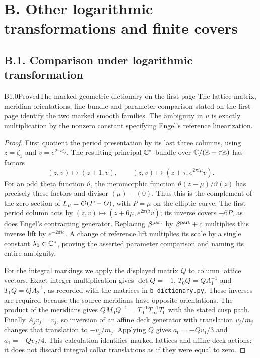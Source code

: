\section{B. Other logarithmic transformations and finite covers}

\subsection{B.1. Comparison under logarithmic transformation}

\begin{claim}{B1.0}{Proved}{The marked geometric dictionary on the first page}
The lattice matrix, meridian orientations, line bundle and parameter
comparison stated on the first page identify the two marked smooth
families. The ambiguity in $u$ is exactly multiplication by the
nonzero constant specifying Engel's reference linearization.
\end{claim}
\begin{proof}
First quotient the period presentation by its last three columns,
using $z=\zeta_1$ and $v=e^{2\pi i\zeta_2}$. The resulting principal
$\mathbb C^*$-bundle over $\mathbb C/(\mathbb Z+\tau\mathbb Z)$ has factors
\[
 (z,v)\mapsto(z+1,v),\qquad
 (z,v)\mapsto(z+\tau,e^{2\pi i\mu}v).
\]
For an odd theta function $\vartheta$, the meromorphic function
$\vartheta(z-\mu)/\vartheta(z)$ has precisely these factors and
divisor $(\mu)-(0)$. Thus this is the complement of the zero section
of $L_\mu=\mathcal O(P-O)$, with $P=\mu$ on the elliptic curve. The first
period column acts by
$(z,v)\mapsto(z+6\mu,e^{2\pi i\beta}v)$; its inverse covers $-6P$,
as does Engel's contracting generator. Replacing $\beta^{\rm part}$
by $\beta^{\rm part}+c$ multiplies this inverse lift by
$e^{-2\pi i c}$. A change of reference lift multiplies its scale by
a single constant $\lambda_0\in\mathbb C^*$, proving the asserted parameter
comparison and naming its entire ambiguity.

For the integral markings we apply the displayed matrix $Q$ to
column lattice vectors. Exact integer multiplication gives
$\det Q=-1$, $T_0Q=QA_1^{-1}$ and $T_1Q=QA_2^{-1}$, as recorded
with the matrices in \texttt{b\_dictionary.py}. These inverses are
required because the source meridians have opposite orientations.
The product of the meridians gives
$QM_0Q^{-1}=T_0^{-1}T_\infty^{-1}T_0$ with the stated cusp path.
Finally $A_jv_j=v_j$, so inversion of an affine deck generator with
translation $v_j/m_j$ changes that translation to $-v_j/m_j$.
Applying $Q$ gives $a_0=-Qv_1/3$ and $a_1=-Qv_2/4$.
This calculation identifies marked lattices and affine deck actions;
it does not discard integral collar translations as if they were
equal to zero.
\end{proof}

